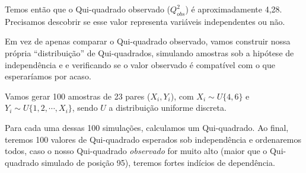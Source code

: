 \documentclass[
]{book}
\begin{document}
Temos então que o Qui-quadrado observado (\(Q_{obs}^2\)) é aproximadamente 4,28. Precisamos descobrir se esse valor representa variáveis independentes ou não.

Em vez de apenas comparar o Qui-quadrado observado, vamos construir nossa própria ``distribuição'' de Qui-quadrados, simulando amostras sob a hipótese de independência e e verificando se o valor observado é compatível com o que esperaríamos por acaso.

Vamos gerar 100 amostras de 23 pares (\(X_i, Y_i\)), com \(X_i \sim U\{4, 6\}\) e \(Y_i \sim U\{1, 2, \cdots, X_i\}\), sendo \(U\) a distribuição uniforme discreta.

Para cada uma dessas 100 simulações, calculamos um Qui-quadrado. Ao final, teremos 100 valores de Qui-quadrado esperados sob independência e ordenaremos todos, caso o nosso Qui-quadrado \emph{observado} for muito alto (maior que o Qui-quadrado simulado de posição 95), teremos fortes indícios de dependência.
\end{document}
